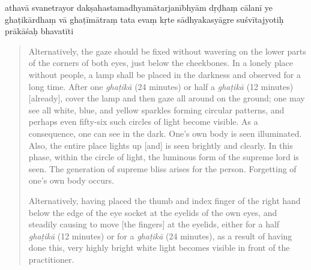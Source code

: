 \begin{itquote}
\begin{ekdosis}
athavā svanetrayor
dakṣahastamadhyamātarjanībhyām
dṛḍhaṃ cālanī ye ghaṭikārdhaṃ vā ghaṭīmātraṃ tata  evaṃ kṛte sādhyakasyāgre suśvītajyotiḥ prākāśaḥ
bhavatīti \normalpipe
{}
\end{ekdosis}
\end{itquote}
\begin{quote}
  Alternatively, the gaze should be fixed without wavering on the lower parts of the corners of both eyes, just below the cheekbones. In a lonely place without people, a lamp shall be placed in the darkness and observed for a long time. After one \textit{ghaṭikā} (24 minutes) or half a \textit{ghaṭikā} (12 minutes) [already], cover the lamp and then gaze all around on the ground; one may see all white, blue, and yellow sparkles forming circular patterns, and perhaps even fifty-six such circles of light become visible. As a consequence, one can see in the dark. One’s own body is seen illuminated. Also, the entire place lights up [and] is seen brightly and clearly. In this phase, within the circle of light, the luminous form of the supreme lord is seen. The generation of supreme bliss arises for the person. Forgetting of one’s own body occurs.
  
  Alternatively, having placed the thumb and index finger of the right hand below the edge of the eye socket at the eyelids of the own eyes, and steadily causing to move [the fingers] at the eyelids, either for a half \textit{ghaṭikā} (12 minutes) or for a \textit{ghaṭikā} (24 minutes), as a result of having done this, very highly bright white light becomes visible in front of the practitioner.
\end{quote} 

